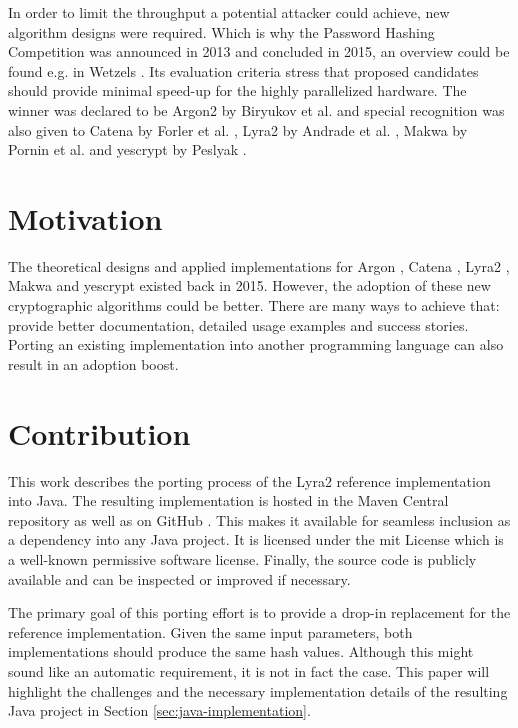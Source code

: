 In order to limit the throughput a potential attacker could achieve, new algorithm designs were required. Which is why the Password Hashing Competition was announced in 2013 and concluded in 2015, an overview could be found e.g. in Wetzels \cite{wetzels:2016:phc}. Its evaluation criteria stress that proposed candidates should provide minimal speed-up for the highly parallelized hardware. The winner was declared to be Argon2 by Biryukov et al. \cite{biryukov:2015:argon2} and special recognition was also given to Catena by Forler et al. \cite{forler:2013:catena}, Lyra2 by Andrade et al. \cite{andrade:2016:lyra2,marcos:2015:lyra2}, Makwa by Pornin et al. \cite{pornin:2015:makwa} and yescrypt by Peslyak \cite{peslyak:2015:yescrypt}.

\section{Motivation}
The theoretical designs and applied implementations for Argon \cite{biryukov:2015:argon2}, Catena \cite{forler:2013:catena}, Lyra2 \cite{andrade:2016:lyra2,marcos:2015:lyra2}, Makwa \cite{pornin:2015:makwa} and yescrypt \cite{peslyak:2015:yescrypt} existed back in 2015. However, the adoption of these new cryptographic algorithms could be better. There are many ways to achieve that: provide better documentation, detailed usage examples and success stories. Porting an existing implementation into another programming language can also result in an adoption boost.

\section{Contribution}
This work describes the porting process of the Lyra2 reference implementation into Java. The resulting implementation is hosted in the Maven Central repository \cite{maven:2017:lyra2} as well as on GitHub \cite{github:2017:lyra2-java}. This makes it available for seamless inclusion as a dependency into any Java project. It is licensed under the \gls{mit} License which is a well-known permissive software license. Finally, the source code is publicly available and can be inspected or improved if necessary.

The primary goal of this porting effort is to provide a drop-in replacement for the reference implementation. Given the same input parameters, both implementations should produce the same hash values. Although this might sound like an automatic requirement, it is not in fact the case. This paper will highlight the challenges and the necessary implementation details of the resulting Java project in Section \ref{sec:java-implementation}.

